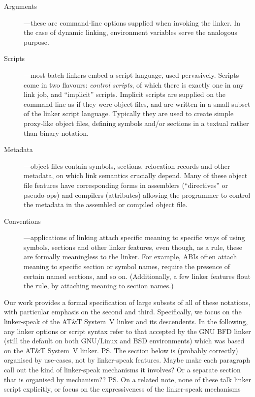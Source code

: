\begin{description}

\item[Arguments] ---these are command-line options supplied when invoking the linker.
In the case of dynamic linking, environment variables serve the analogous purpose.

\item[Scripts] ---most batch linkers embed a script language, used pervasively.
Scripts come in two flavours: \emph{control scripts}, 
of which there is exactly one in any link job,
and ``implicit'' scripts. 
Implicit scripts are supplied on the command line as if they were object files, 
and are written in a small subset of the linker script language.
Typically they are used to create simple proxy-like object files, defining symbols
and/or sections in a textual rather than binary notation.

\item[Metadata] ---object files contain symbols, sections, relocation records
and other metadata, on which link semantics crucially depend. Many of these 
object file features have corresponding forms in assemblers (``directives'' or pseudo-ops) and compilers (attributes) allowing the programmer
to control the metadata in the assembled or compiled object file.

\item[Conventions] ---applications of linking attach specific meaning to 
specific ways of using symbols, sections and other linker features, even though, 
as a rule, these are formally meaningless to the linker.
For example, ABIs often attach meaning to specific section or symbol names,
require the presence of certain named sections, and so on.
(Additionally, a few linker features flout the rule, by attaching meaning to section names.)


\end{description}


Our work provides a formal specification
of large subsets of all of these notations, with particular emphasis on
the second and third.
Specifically, we focus on the linker-speak of the AT\&T System~V linker
and its descendents. 
In the following, any linker options or script syntax
refer to that accepted by the GNU BFD linker
(still the 
default on both GNU/Linux and BSD environments)
which was based on the AT\&T System~V linker.
\ps{The section below is (probably correctly) organised by
  use-cases, not by linker-speak features.  Maybe make each paragraph
  call out the kind of linker-speak mechanisms it involves?  Or a
  separate section that is organised by mechanism??}
\ps{On a related note, none of these talk linker script explicitly, or
  focus on the expressiveness of the linker-speak mechanisms}

